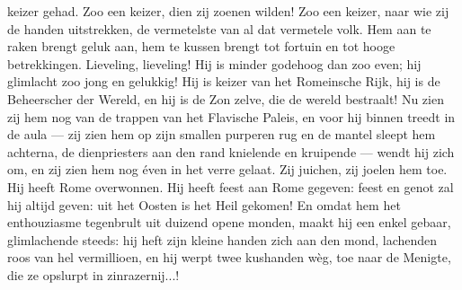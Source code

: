 \documentclass[a4paper, 12pt, oneside, dutch]{article}
\begin{document}
keizer gehad. Zoo een keizer, dien zij zoenen wilden! Zoo een keizer, naar wie zij de handen uitstrekken, de vermetelste van al dat vermetele volk. Hem aan te raken brengt geluk aan, hem te kussen brengt tot fortuin en tot hooge betrekkingen. Lieveling, lieveling! Hij is minder godehoog dan zoo even; hij glimlacht zoo jong en gelukkig! Hij is keizer van het Romeinsche Rijk, hij is de Beheerscher der Wereld, en hij is de Zon zelve, die de wereld bestraalt! Nu zien zij hem nog van de trappen van het Flavische Paleis, en voor hij binnen treedt in de aula --- zij zien hem op zijn smallen purperen rug en de mantel sleept hem achterna, de dienpriesters aan den rand knielende en kruipende --- wendt hij zich om, en zij zien hem nog éven in het verre gelaat. Zij juichen, zij joelen hem toe. Hij heeft Rome overwonnen. Hij heeft feest aan Rome gegeven: feest en genot zal hij altijd geven: uit het Oosten is het Heil gekomen! En omdat hem het enthouziasme tegenbrult uit duizend opene monden, maakt hij een enkel gebaar, glimlachende steeds: hij heft zijn kleine handen zich aan den mond, lachenden roos van hel vermillioen, en hij werpt twee kushanden wèg, toe naar de Menigte, die ze opslurpt in zinrazernij...!
\end{document}
